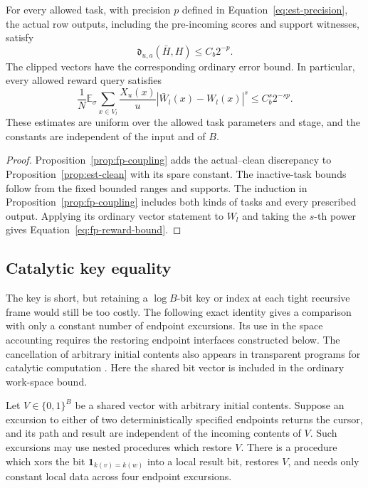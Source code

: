 \begin{theorem}
\label{thm:fp-estimators}
For every allowed task, with precision $p$ defined in
Equation~\eqref{eq:est-precision}, the actual row outputs, including the
pre-incoming scores and support witnesses, satisfy
\[
                \mathfrak d_{u,a}(\bar H,H)\le C_b2^{-p}.
\]
The clipped vectors have the corresponding ordinary error bound.
In particular, every allowed reward query satisfies
\begin{equation}
 \frac1N\mathbb E_\sigma\sum_{x\in V_l}\frac{X_u(x)}u
           |\bar W_l(x)-W_l(x)|^s\le C_b^s2^{-sp}.
 \label{eq:fp-reward-bound}
\end{equation}
These estimates are uniform over the allowed task parameters and stage,
and the constants are independent of the input and of $B$.
\end{theorem}

\begin{proof}
Proposition~\ref{prop:fp-coupling} adds the actual--clean discrepancy
to Proposition~\ref{prop:est-clean} with its spare constant.  The
inactive-task bounds follow from the fixed bounded ranges and supports.
The induction in Proposition~\ref{prop:fp-coupling} includes both kinds
of tasks and every prescribed output.  Applying its ordinary vector
statement to $W_l$ and taking the $s$-th power gives
Equation~\eqref{eq:fp-reward-bound}.
\end{proof}

\subsection{Catalytic key equality}

The key is short, but retaining a $\log B$-bit key or index at each tight
recursive frame would still be too costly.  The following exact
identity gives a comparison with only a constant number of endpoint
excursions.  Its use in the space accounting requires the restoring
endpoint interfaces constructed below.
The cancellation of arbitrary initial contents also appears in
transparent programs for catalytic computation
\cite[Section~3]{BuhrmanCleveKouckyLoffSpeelman2014}.  Here the shared bit
vector is included in the ordinary work-space bound.

\begin{lemma}\label{lem:fp-catalytic}
Let $V\in\{0,1\}^B$ be a shared vector with arbitrary initial contents.
Suppose an excursion to either of two deterministically specified
endpoints returns the cursor, and its path and result are independent
of the incoming contents of $V$.  Such excursions may use nested
procedures which restore $V$.  There is a procedure which xors the bit
$\mathbf1_{k(v)=k(w)}$ into a local result bit, restores $V$, and needs
only constant local data across four endpoint excursions.
\end{lemma}

